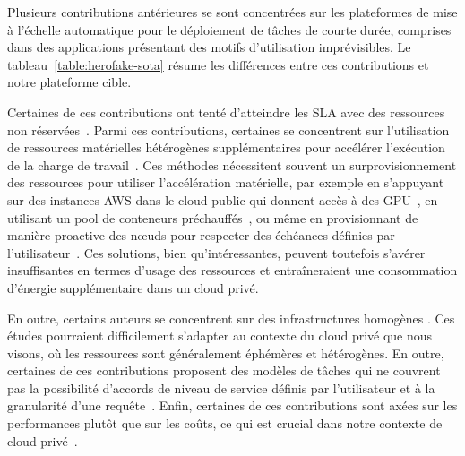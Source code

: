 Plusieurs contributions antérieures se sont concentrées sur les plateformes de mise à l'échelle automatique pour le déploiement de tâches de courte durée, comprises dans des applications présentant des motifs d'utilisation imprévisibles. Le tableau~\ref{table:herofake-sota} résume les différences entre ces contributions et notre plateforme cible.

Certaines de ces contributions ont tenté d'atteindre les SLA avec des ressources non réservées~\cite{gujaratiSwayamDistributedAutoscaling2017, zhangMArkExploitingCloud, mampageDeadlineawareDynamicResource2021, singhviAtollScalableLowLatency2021, handaoui2020releaser, handaoui2020salamander, yalles2022riscless}. Parmi ces contributions, certaines se concentrent sur l'utilisation de ressources matérielles hétérogènes supplémentaires pour accélérer l'exécution de la charge de travail~\cite{zhangMArkExploitingCloud, lingPigeonDynamicEfficient2019, yangINFlessNativeServerless2022}. Ces méthodes nécessitent souvent un surprovisionnement des ressources pour utiliser l'accélération matérielle, par exemple en s'appuyant sur des instances AWS dans le cloud public qui donnent accès à des GPU~\cite{zhangMArkExploitingCloud}, en utilisant un pool de conteneurs préchauffés~\cite{lingPigeonDynamicEfficient2019}, ou même en provisionnant de manière proactive des nœuds pour respecter des échéances définies par l'utilisateur~\cite{singhviAtollScalableLowLatency2021}. Ces solutions, bien qu'intéressantes, peuvent toutefois s'avérer insuffisantes en termes d'usage des ressources et entraîneraient une consommation d'énergie supplémentaire dans un cloud privé.

En outre, certains auteurs se concentrent sur des infrastructures homogènes \cite{gujaratiSwayamDistributedAutoscaling2017, sureshENSUREEfficientScheduling2020, mampageDeadlineawareDynamicResource2021, singhviAtollScalableLowLatency2021, yangINFlessNativeServerless2022}. Ces études pourraient difficilement s'adapter au contexte du cloud privé que nous visons, où les ressources sont généralement éphémères et hétérogènes. En outre, certaines de ces contributions proposent des modèles de tâches qui ne couvrent pas la possibilité d'accords de niveau de service définis par l'utilisateur et à la granularité d'une requête~\cite{sureshENSUREEfficientScheduling2020, lingPigeonDynamicEfficient2019}. Enfin, certaines de ces contributions sont axées sur les performances plutôt que sur les coûts, ce qui est crucial dans notre contexte de cloud privé~\cite{gujaratiSwayamDistributedAutoscaling2017, lingPigeonDynamicEfficient2019, singhviAtollScalableLowLatency2021, choSLADrivenMLInference}.

